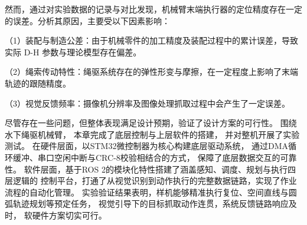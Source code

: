 然而，通过对实验数据的记录与对比发现，机械臂末端执行器的定位精度存在一定的误差。分析其原因，主要受以下因素影响：

（1）装配与制造公差：由于机械零件的加工精度及装配过程中的累计误差，导致实际 D-H 参数与理论模型存在偏差。

（2）绳索传动特性：绳驱系统存在的弹性形变与摩擦，在一定程度上影响了末端轨迹的跟随精度。

（3）视觉反馈频率：摄像机分辨率及图像处理抓取过程中会产生了一定误差。

尽管存在一些问题，但整体表现满足设计预期，验证了设计方案的可行性。
围绕水下绳驱机械臂，
本章完成了底层控制与上层软件的搭建，
并对整机开展了实验测试。
在硬件层面，以STM32微控制器为核心构建底层驱动系统，
通过DMA循环缓冲、串口空闲中断与CRC-8校验相结合的方式，
保障了底层数据交互的可靠性。
软件层面，基于ROS 2的模块化特性搭建了涵盖感知、调度、规划与执行四层逻辑的
控制平台，打通了从视觉识别到动作执行的完整数据链路，实现了作业流程的自动化管理。
实验验证结果表明，样机能够精准执行复位、空间直线与圆弧轨迹规划等预定任务，
视觉引导下的目标抓取动作连贯，系统反馈链路响应及时，
软硬件方案切实可行。
\clearpage{
  \pagestyle{plain}
  \cleardoublepage
}